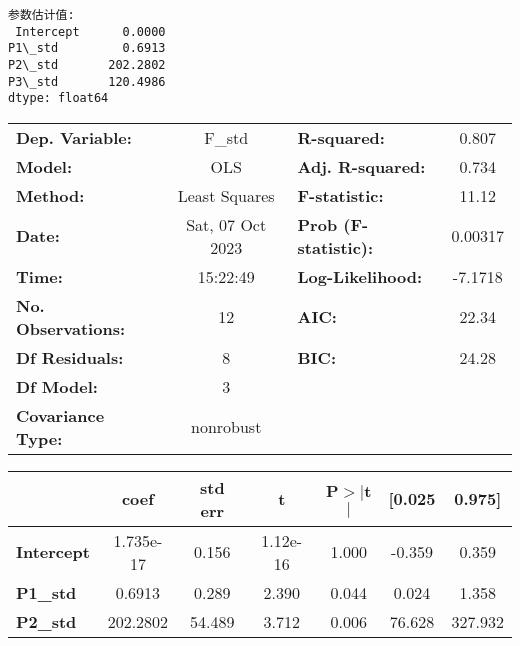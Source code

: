 \documentclass[11pt]{article}
\newcommand{\prompt}[4]{
        {\ttfamily\llap{{\color{#2}[#3]:\hspace{3pt}#4}}\vspace{-\baselineskip}}
    }
\begin{document}
    \begin{Verbatim}[commandchars=\\\{\}]
参数估计值:
 Intercept      0.0000
P1\_std         0.6913
P2\_std       202.2802
P3\_std       120.4986
dtype: float64
    \end{Verbatim}
 
            
\prompt{Out}{outcolor}{102}{}
    
    \begin{center}
\begin{tabular}{lclc}
\toprule
\textbf{Dep. Variable:}    &      F\_std      & \textbf{  R-squared:         } &     0.807   \\
\textbf{Model:}            &       OLS        & \textbf{  Adj. R-squared:    } &     0.734   \\
\textbf{Method:}           &  Least Squares   & \textbf{  F-statistic:       } &     11.12   \\
\textbf{Date:}             & Sat, 07 Oct 2023 & \textbf{  Prob (F-statistic):} &  0.00317    \\
\textbf{Time:}             &     15:22:49     & \textbf{  Log-Likelihood:    } &   -7.1718   \\
\textbf{No. Observations:} &          12      & \textbf{  AIC:               } &     22.34   \\
\textbf{Df Residuals:}     &           8      & \textbf{  BIC:               } &     24.28   \\
\textbf{Df Model:}         &           3      & \textbf{                     } &             \\
\textbf{Covariance Type:}  &    nonrobust     & \textbf{                     } &             \\
\bottomrule
\end{tabular}
\begin{tabular}{lcccccc}
                   & \textbf{coef} & \textbf{std err} & \textbf{t} & \textbf{P$> |$t$|$} & \textbf{[0.025} & \textbf{0.975]}  \\
\midrule
\textbf{Intercept} &    1.735e-17  &        0.156     &  1.12e-16  &         1.000        &       -0.359    &        0.359     \\
\textbf{P1\_std}   &       0.6913  &        0.289     &     2.390  &         0.044        &        0.024    &        1.358     \\
\textbf{P2\_std}   &     202.2802  &       54.489     &     3.712  &         0.006        &       76.628    &      327.932     \\

\end{tabular}
\end{center}
\end{document}
